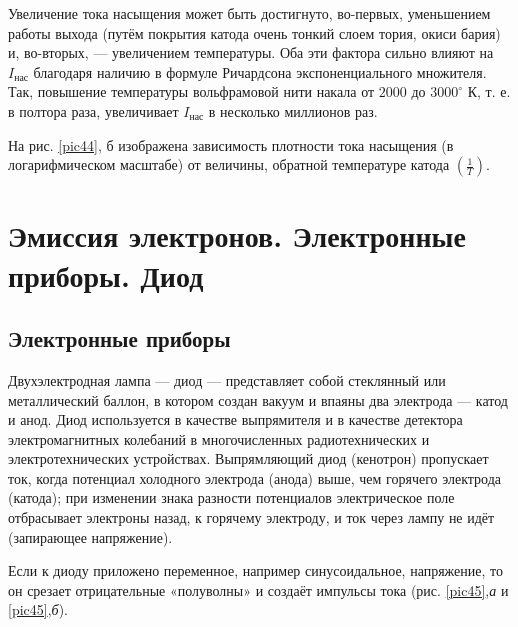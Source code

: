 \documentclass[a4paper,10pt]{book}
\begin{document}
Увеличение тока насыщения может быть достигнуто, во-первых, уменьшением работы выхода (путём покрытия катода очень тонкий слоем тория, окиси бария) и, во-вторых, — увеличением температуры. Оба эти фактора сильно влияют на $I_\text{нас}$ благодаря наличию в формуле Ричардсона экспоненциального множителя. Так, повышение температуры вольфрамовой нити накала от $2000$ до $3000^{\circ}\text{ К}$, т. е. в полтора раза, увеличивает $I_\text{нас}$ в несколько миллионов раз.

На рис. \ref{pic44}, б изображена зависимость плотности тока насыщения (в логарифмическом масштабе) от величины, обратной температуре катода $(\frac{1}{T})$.


\chapter{Эмиссия электронов. Электронные приборы. Диод}
\section{Электронные приборы}
Двухэлектродная лампа — диод — представляет собой стеклянный или металлический баллон, в котором создан вакуум и впаяны два электрода — катод и анод. Диод используется в качестве выпрямителя и в качестве детектора электромагнитных колебаний в многочисленных радиотехнических и электротехнических устройствах. Выпрямляющий диод (кенотрон) пропускает ток, когда потенциал холодного электрода (анода) выше, чем горячего электрода (катода); при изменении знака разности потенциалов электрическое поле отбрасывает электроны назад, к горячему электроду, и ток через лампу не идёт (запирающее напряжение).

Если к диоду приложено переменное, например синусоидальное, напряжение, то он срезает отрицательные «полуволны» и создаёт импульсы тока (рис. \ref{pic45},\textit{а} и \ref{pic45},\textit{б}).
\end{document}

